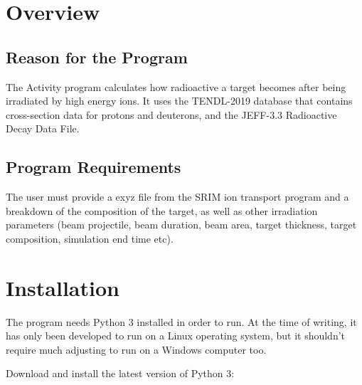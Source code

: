 \documentclass[12pt,twoside]{manual}
\begin{document}


\tableofcontents






\chapter{Overview}

\section{Reason for the Program}

The Activity program calculates how radioactive a target becomes after being irradiated by high energy ions.  It uses the TENDL-2019\cite{tendl2019} database that contains cross-section data for protons and deuterons, and the JEFF-3.3 Radioactive Decay Data File\cite{jeff33}.

\section{Program Requirements}

The user must provide a exyz file from the SRIM\cite{srim} ion transport program and a breakdown of the composition of the target, as well as other irradiation parameters (beam projectile, beam duration, beam area, target thickness, target composition, simulation end time etc).




\chapter{Installation}

The program needs Python 3 installed in order to run.  At the time of writing, it has only been developed to run on a Linux operating system, but it shouldn't require much adjusting to run on a Windows computer too.

Download and install the latest version of Python 3:
\end{document}
